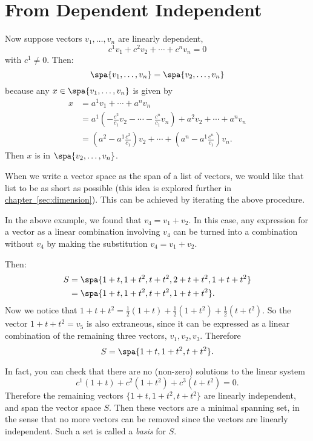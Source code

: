 \section{From Dependent Independent } 
Now suppose vectors 
$v_1,\ldots, v_n$ are linearly dependent, 
\[
c^1v_1 + c^2v_2+ \cdots +c^nv_n=0
\]
with $c^1\neq 0$.  Then:
\[
\spa \{v_1,\ldots, v_n\} = \spa \{ v_2,\ldots, v_n\}
\]
because any $x\in \spa \{v_1,\ldots, v_n\}$ is given by
\begin{align*}
x &= a^1v_1 + \cdots+ a^nv_n \\
&= a^1\left( -\frac{c^2}{c_1}v_2- \cdots -\frac{c^n}{c_1}v_n \right) + a^2v_2 + \cdots + a^nv_n \\
&= \left(a^2-a^1\frac{c^2}{c_1}\right)v_2 + \cdots + \left(a^n-a^1\frac{c^n}{c_1}\right)v_n.
\end{align*}
Then $x$ is in $\spa \{v_2,\ldots, v_n\}$.

When we write a vector space as the span of a list of vectors, we would like that list to be as short as possible (this idea is explored further in \hyperref[dimension]{chapter~\ref*{sec:dimension}}).
This can be achieved by iterating the above procedure.

\begin{example}
In the above example, we found that $v_4=v_1+v_2$.  In this case, any expression for a vector as a linear combination involving $v_4$ can be turned into a combination without $v_4$ by making the substitution $v_4=v_1+v_2$.

Then:
\begin{align*}
S &= \spa \{ 1+t , 1+t^2, t+t^2, 2+t+t^2, 1+t+t^2 \} \\
&= \spa \{ 1+t , 1+t^2, t+t^2, 1+t+t^2 \}.
\end{align*}
Now we notice that $1+t+t^2=\frac{1}{2}(1+t) +\frac{1}{2}(1+t^2) + \frac{1}{2}(t+t^2)$.  So the vector $1+t+t^2=v_5$ is also extraneous, since it can be expressed as a linear combination of the remaining three vectors, $v_1, v_2,v_3$.  Therefore 
\[
S = \spa \{ 1+t , 1+t^2, t+t^2 \}.
\]

In fact, you can check that there are no (non-zero) solutions to the linear system
\[
c^1(1+t) + c^2(1+t^2) + c^3(t+t^2)=0.
\]
Therefore the remaining vectors $\{ 1+t , 1+t^2, t+t^2 \}$ are linearly independent, and span the vector space $S$.  Then these vectors are a minimal spanning set, in the sense that no more vectors can be removed since the vectors are linearly independent.
Such a set is called a \emph{basis} for $S$.
\end{example}





